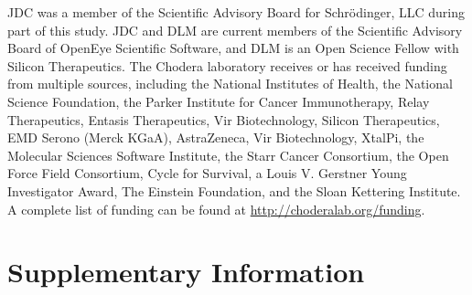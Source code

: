 \documentclass[9pt,lineno,final]{elife}
\newcommand{\beginsupplement}{%
        \setcounter{table}{0}
        \renewcommand{\thetable}{S\arabic{table}}%
        \setcounter{figure}{0}
        \renewcommand{\thefigure}{S\arabic{figure}}%
     }
\begin{document}
JDC was a member of the Scientific Advisory Board for Schr\"{o}dinger, LLC during part of this study.
JDC and DLM are current members of the Scientific Advisory Board of OpenEye Scientific Software, and DLM is an Open Science Fellow with Silicon Therapeutics.
The Chodera laboratory receives or has received funding from multiple sources, including the National Institutes of Health, the National Science Foundation, the Parker Institute for Cancer Immunotherapy, Relay Therapeutics, Entasis Therapeutics, Vir Biotechnology, Silicon Therapeutics, EMD Serono (Merck KGaA), AstraZeneca, Vir Biotechnology, XtalPi, the Molecular Sciences Software Institute, the Starr Cancer Consortium, the Open Force Field Consortium, Cycle for Survival, a Louis V. Gerstner Young Investigator Award, The Einstein Foundation, and the Sloan Kettering Institute.
A complete list of funding can be found at \url{http://choderalab.org/funding}.






\newpage
\beginsupplement
\section{Supplementary Information}
\end{document}
